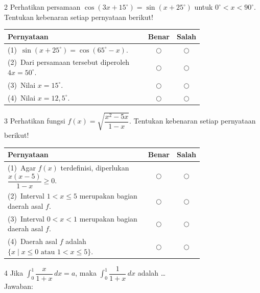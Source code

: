\documentclass[11pt]{article}
\begin{document}
\begin{soal}{2}
Perhatikan persamaan $\cos(3x+15^\circ)=\sin(x+25^\circ)$
untuk $0^\circ<x<90^\circ$.
Tentukan kebenaran setiap pernyataan berikut!

\par\smallskip
{\renewcommand{\arraystretch}{1.4}%
\begin{tabular}{@{}p{0.76\linewidth}cc@{}}
\hline
\textbf{Pernyataan} & \textbf{Benar} & \textbf{Salah}\\
\hline
(1)~$\sin(x+25^\circ) = \cos(65^\circ-x)$.
  & $\bigcirc$ & $\bigcirc$\\
(2)~Dari persamaan tersebut diperoleh $4x = 50^\circ$.
  & $\bigcirc$ & $\bigcirc$\\
(3)~Nilai $x = 15^\circ$.
  & $\bigcirc$ & $\bigcirc$\\
(4)~Nilai $x = 12{,}5^\circ$.
  & $\bigcirc$ & $\bigcirc$\\
\hline
\end{tabular}}
\end{soal}

\begin{soal}{3}
Perhatikan fungsi $f(x)=\sqrt{\dfrac{x^2-5x}{1-x}}$.
Tentukan kebenaran setiap pernyataan berikut!

\par\smallskip
{\renewcommand{\arraystretch}{1.4}%
\begin{tabular}{@{}p{0.76\linewidth}cc@{}}
\hline
\textbf{Pernyataan} & \textbf{Benar} & \textbf{Salah}\\
\hline
(1)~Agar $f(x)$ terdefinisi, diperlukan $\dfrac{x(x-5)}{1-x}\geq0$.
  & $\bigcirc$ & $\bigcirc$\\
(2)~Interval $1<x\leq5$ merupakan bagian daerah asal $f$.
  & $\bigcirc$ & $\bigcirc$\\
(3)~Interval $0<x<1$ merupakan bagian daerah asal $f$.
  & $\bigcirc$ & $\bigcirc$\\
(4)~Daerah asal $f$ adalah $\{x\mid x\leq0\text{ atau }1<x\leq5\}$.
  & $\bigcirc$ & $\bigcirc$\\
\hline
\end{tabular}}
\end{soal}

\begin{soal}{4}
Jika $\displaystyle\int_0^1\dfrac{x}{1+x}\,dx=a$, maka
$\displaystyle\int_0^1\dfrac{1}{1+x}\,dx$ adalah \ldots\\[0.4em]
Jawaban:\enspace\underline{\hspace{4cm}}
\end{soal}
\end{document}
